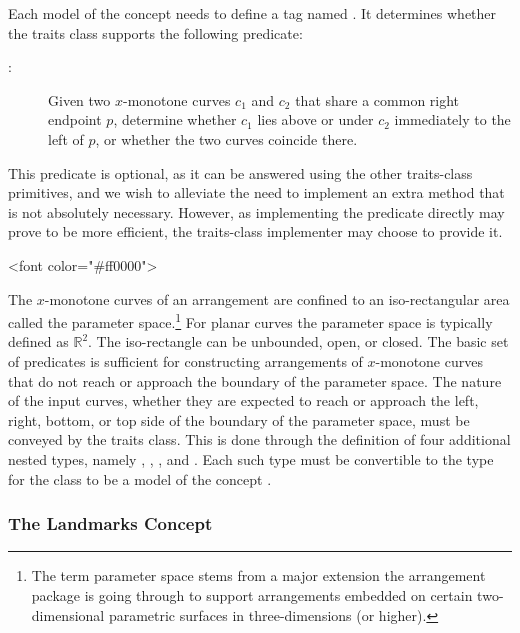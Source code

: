 Each model of the concept 
needs to define a tag named . It determines
whether the traits class supports the following predicate:
\begin{description}
\item[:]
  Given two $x$-monotone curves $c_1$ and $c_2$ that share a common
  right endpoint $p$, determine whether $c_1$ lies above or under
  $c_2$ immediately to the left of $p$, or whether the two curves
  coincide there.
\end{description}
This predicate is optional, as it can be answered using the
other traits-class primitives, and we wish to alleviate the
need to implement an extra method that is not absolutely
necessary. However, as implementing the predicate directly
may prove to be more efficient, the traits-class
implementer may choose to provide it.

\lcTex{\color{red}}
\begin{ccHtmlOnly}
<font color="#ff0000">
\end{ccHtmlOnly}
The $x$-monotone curves of an arrangement are confined to an
iso-rectangular area called the parameter space.\footnote{The term
  parameter space stems from a major extension the arrangement
  package is going through to support arrangements embedded on
  certain two-dimensional parametric surfaces in three-dimensions
  (or higher).} For planar curves the parameter space is typically
defined as $\mathbb{R}^2$. The iso-rectangle can be unbounded, open,
or closed. The basic set of predicates is sufficient for constructing
arrangements of $x$-monotone curves that do not reach or approach the
boundary of the parameter space. The nature of the input curves,
whether they are expected to reach or approach the left, right,
bottom, or top side of the boundary of the parameter space, must be
conveyed by the traits class. This is done through the definition of
four additional nested types, namely ,
, , and
. Each such type must be convertible to the
type  for the class to be a model of the
concept .
\lcTex{\color{black}}

\subsubsection{The Landmarks Concept
\label{arr_sssec:tr_lanmarks_concept}}

